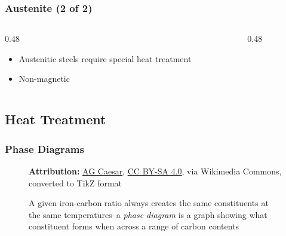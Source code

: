 \begin{frame}
	\frametitle{Austenite (2 of 2)}

    \begin{columns}
        \begin{column}{0.48\linewidth}
            \begin{itemize}[<+- | alert@+>]
                \item Austenitic steels require special heat treatment
                \item Non-magnetic
            \end{itemize}
        \end{column}
        \begin{column}{0.48\linewidth}
        \end{column}
    \end{columns}
\end{frame}

\subsection{Heat Treatment}

\begin{frame}
    \frametitle{Phase Diagrams}

    \begin{figure}
        \centering
        \resizebox{0.5\linewidth}{!}{
            
        }

        \vspace{0.5em}
        {\tiny \textbf{Attribution:} \href{https://commons.wikimedia.org/wiki/File:Iron_carbon_phase_diagram.svg}{AG Caesar}, \href{http://creativecommons.org/licenses/by-sa/4.0/}{CC BY-SA 4.0}, via Wikimedia Commons, converted to TikZ format\par}

        \vspace{0.5em}
        {\footnotesize A given iron-carbon ratio always creates the same constituents at the same temperatures--a \emph{phase diagram} is a graph showing what constituent forms when across a range of carbon contents\par}
    \end{figure}
\end{frame}

